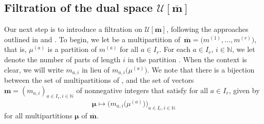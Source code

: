 \documentclass[10pt,a4paper]{amsart}
\numberwithin{equation}{section}
\begin{document}
\subsection[Filtration of the dual space Um]{Filtration of the dual space $\boldsymbol{\mathcal{U}[\overline{\mathbf{m}}]}$}\label{Section 3.3}

Our next step is to introduce a filtration on $\mathcal{U}[\overline{\mathbf{m}}]$, following the approaches outlined in \cite[Section 3.4]{AKS06} and \cite[Section 4.1]{AK07}. To begin, we let  be a multipartition of~${\overline{\mathbf{m}}=\bigl(m^{(1)},\dots, m^{(r)}\bigr)}$, that is, $\mu^{(a)}$ is a partition of $m^{(a)}$ for all $a\in I_r$. For each $a\in I_r$, $i\in\mathbb{N}$, we let  denote the number of parts of length $i$ in the partition . When the context is clear, we will write $m_{a,i}$ in lieu of $m_{a,i}\bigl(\mu^{(a)}\bigr)$. We note that there is a bijection between the set of multipartitions  of , and the set of vectors~${\mathbf{m}=(m_{a,i})_{a\in I_r,i\in\mathbb{N}}}$ of nonnegative integers that satisfy  for all $a\in I_r$, given by
\begin{equation}\label{eq:3.21}
\bm{\mu}\mapsto\bigl(m_{a,i}\bigl(\mu^{(a)}\bigr)\bigr)_{a\in I_r,i\in\mathbb{N}}
\end{equation}
for all multipartitions $\bm{\mu}$ of $\overline{\mathbf{m}}$.
\end{document}
